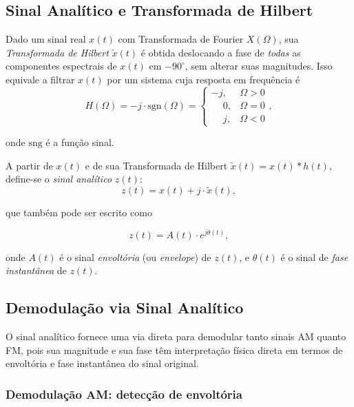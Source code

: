 \documentclass[a4paper,twoside,12pt]{article}
\begin{document}
	
	\subsection{Sinal Analítico e Transformada de Hilbert}
	\label{sec:Hilbert}
	
	Dado um sinal real $x(t)$ com Transformada de Fourier $X(\Omega)$, sua \emph{Transformada de Hilbert} $\tilde{x}(t)$ é obtida deslocando a fase de \emph{todas} as componentes espectrais de $x(t)$ em $-90^\circ$, sem alterar suas magnitudes. Isso equivale a filtrar $x(t)$ por um sistema cuja resposta em frequência é
	\begin{equation}
		H(\Omega) = -j \cdot \mathrm{sgn}(\Omega) = 
		\begin{cases}
			-j, & \Omega > 0\\
			\phantom{-}0, & \Omega = 0\\
			\phantom{-}j, & \Omega < 0
		\end{cases},
	\end{equation}
	
	\noindent onde $\mathrm{sng}$ é a função sinal.
	
	A partir de $x(t)$ e de sua Transformada de Hilbert $\tilde{x}(t) = x(t) * h(t)$, define-se o \emph{sinal analítico} $z(t)$:
	\begin{equation}
		z(t) = x(t) + j \cdot \tilde{x}(t),
	\end{equation}
	
	\noindent que também pode ser escrito como 
	
	\begin{equation}
		z(t) = A(t) \cdot e^{j \theta(t)},
	\end{equation}
	
	\noindent onde $A(t)$ é o sinal \emph{envoltória} (ou \emph{envelope}) de $z(t)$, e $\theta(t)$ é o sinal de \emph{fase instantânea} de $z(t)$.
	
	
	\subsection{Demodulação via Sinal Analítico}
	\label{sec:demod}
	
	O sinal analítico fornece uma via direta para demodular tanto sinais AM quanto FM, pois sua magnitude e sua fase têm interpretação física direta em termos de envoltória e fase instantânea do sinal original.
	
	\subsubsection{Demodulação AM: detecção de envoltória}
	
\end{document}
